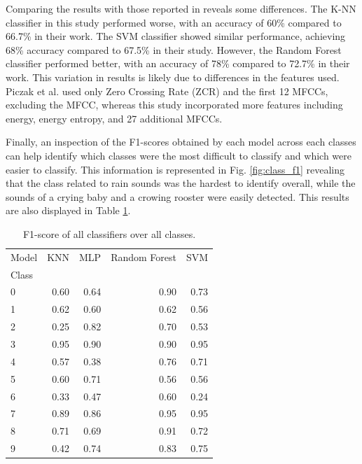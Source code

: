 \documentclass[journal]{IEEEtran}
\begin{document}
Comparing the results with those reported in \cite{esc-50} reveals some differences. The K-NN classifier in this study performed worse, with an accuracy of 60\% compared to 66.7\% in their work. The SVM classifier showed similar performance, achieving 68\% accuracy compared to 67.5\% in their study. However, the Random Forest classifier performed better, with an accuracy of 78\% compared to 72.7\% in their work. This variation in results is likely due to differences in the features used. Piczak et al. used only Zero Crossing Rate (ZCR) and the first 12 MFCCs, excluding the  MFCC, whereas this study incorporated more features including energy, energy entropy, and 27 additional MFCCs.

Finally, an inspection of the F1-scores obtained by each model across each classes can help identify which classes were the most difficult to classify and which were easier to classify. This information is represented in Fig. \ref{fig:class_f1} revealing that the class related to rain sounds was the hardest to identify overall, while the sounds of a crying baby and a crowing rooster were easily detected. This results are also displayed in Table \ref{tab:f1-scores}.
\begin{table}[t]
\centering
\caption{F1-score of all classifiers over all classes.}
\begin{tabular}{lrrrr}
\toprule
Model & KNN & MLP & Random Forest & SVM \\
Class &  &  &  &  \\
\midrule
0 & 0.60 & 0.64 & 0.90 & 0.73 \\
1 & 0.62 & 0.60 & 0.62 & 0.56 \\
2 & 0.25 & 0.82 & 0.70 & 0.53 \\
3 & 0.95 & 0.90 & 0.90 & 0.95 \\
4 & 0.57 & 0.38 & 0.76 & 0.71 \\
5 & 0.60 & 0.71 & 0.56 & 0.56 \\
6 & 0.33 & 0.47 & 0.60 & 0.24 \\
7 & 0.89 & 0.86 & 0.95 & 0.95 \\
8 & 0.71 & 0.69 & 0.91 & 0.72 \\
9 & 0.42 & 0.74 & 0.83 & 0.75 \\
\bottomrule
\end{tabular}
\label{tab:f1-scores}
\end{table}
\end{document}
